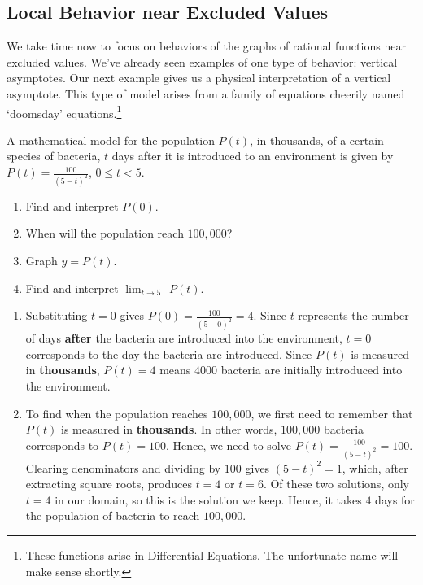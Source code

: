 \documentclass{ximera}
\begin{document}
\subsection{Local Behavior near Excluded Values}
\label{vaorholesection}

We take time now to focus on behaviors of the graphs of rational functions near excluded values.  We've already seen examples of one type of behavior:  vertical asymptotes.  Our next example gives us a physical interpretation of a vertical asymptote.  This type of model arises from a family of equations cheerily named `doomsday' equations.\footnote{These functions arise in Differential Equations.  The unfortunate name will make sense shortly.}  

\begin{example}  \label{doomsdaypopex} A mathematical model for the population $P(t)$, in thousands, of a certain species of bacteria, $t$ days after it is introduced to an environment is given by $P(t) = \frac{100}{(5-t)^{2}}$, $0 \leq t < 5$.


\begin{enumerate}

\item  Find and interpret $P(0)$.

\item  When will the population reach $100,\!000$?

\item  Graph $y = P(t)$.  

\item  Find and interpret $\lim_{t \rightarrow 5^{-}} P(t)$.

\end{enumerate}

\begin{explanation}

\begin{enumerate}

\item  Substituting $t=0$ gives $P(0) = \frac{100}{(5-0)^2} = 4$.  Since $t$ represents the number of days \textbf{after} the bacteria are introduced into the environment, $t =0$ corresponds to the day the bacteria are introduced.  Since $P(t)$ is measured in \textbf{thousands}, $P(t) = 4$  means $4000$ bacteria are initially introduced into the environment.

\item  To find when the population reaches $100,\! 000$, we first need to remember that $P(t)$ is measured in \textbf{thousands}.  In other words, $100,\! 000$ bacteria corresponds to $P(t) = 100$.  Hence, we need to solve  $P(t) = \frac{100}{(5-t)^2} = 100$.  Clearing denominators and dividing by $100$ gives $(5-t)^2=1$, which, after extracting square roots, produces $t = 4$ or $t=6$.  Of these two solutions, only $t=4$ in our domain, so this is the solution we keep.  Hence, it takes $4$ days for the population of bacteria to reach $100,\! 000$.


\end{enumerate}
\end{explanation}
\end{example}
\end{document}
